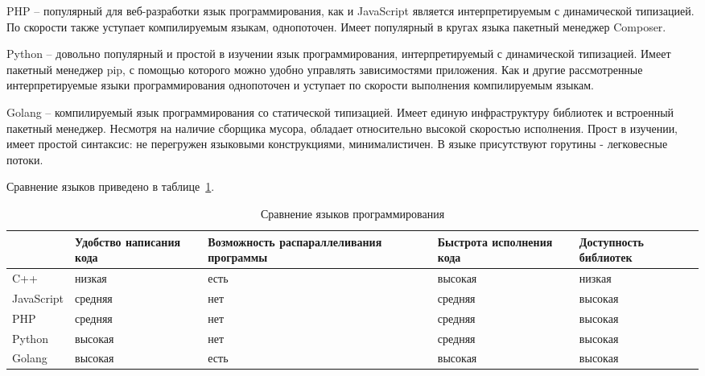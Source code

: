 PHP – популярный для веб-разработки язык программирования, как и
JavaScript является интерпретируемым с динамической типизацией. По
скорости также уступает компилируемым языкам, однопоточен. Имеет
популярный в кругах языка пакетный менеджер Composer.

Python – довольно популярный и простой в изучении язык
программирования, интерпретируемый с динамической типизацией. Имеет
пакетный менеджер pip, с помощью которого можно удобно управлять
зависимостями приложения. Как и другие рассмотренные интерпретируемые
языки программирования однопоточен и уступает по скорости выполнения
компилируемым языкам.

Golang – компилируемый язык программирования со статической
типизацией. Имеет единую инфраструктуру библиотек и встроенный
пакетный менеджер. Несмотря на наличие сборщика мусора, обладает
относительно высокой скоростью исполнения. Прост в изучении, имеет
простой синтаксис: не перегружен языковыми конструкциями,
минималистичен. В языке присутствуют горутины - легковесные потоки.

Сравнение языков приведено в таблице~\ref{t:comp-lang}.

\begin{table}[ht]
	\Large
	\begin{threeparttable}
		\caption{Сравнение языков программирования}
		\label{t:comp-lang}
		\centering
		\begin{tabularx}{\textwidth}
			{|>{}X
			|>{\centering\arraybackslash}X
			|>{\centering\arraybackslash}X
			|>{\centering\arraybackslash}X
			|>{\centering\arraybackslash}X|}
			\hline
			                                        &
			Удобство написания кода                 &
			Возможность распараллеливания программы &
			Быстрота исполнения кода                &
			Доступность библиотек                                                        \\
			\hline
			C++
			                                        & низкая  & есть & высокая & низкая  \\
			\hline
			JavaScript
			                                        & средняя & нет  & средняя & высокая \\
			\hline
			PHP
			                                        & средняя & нет  & средняя & высокая \\
			\hline
			Python
			                                        & высокая & нет  & средняя & высокая \\
			\hline
			Golang
			                                        & высокая & есть & высокая & высокая \\
			\hline
		\end{tabularx}
	\end{threeparttable}
	\vspace{\bottompaddingoftable}
\end{table}


